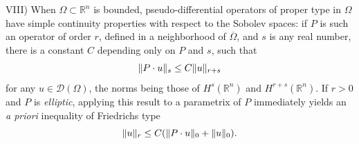 \documentclass[12pt,a4paper,leqno,twoside]{extbook}
\DeclarePairedDelimiter{\norm}{\lVert}{\rVert}
\newcommand{\R}{\mathbb{R}}
\begin{document}
VIII) When \(\Omega \subset \R^n\) is bounded, pseudo-differential operators of proper type in \(\Omega\) have simple continuity properties with respect to the Sobolev spaces: if \(P\) is such an operator of order \(r\), defined in a neighborhood of \(\overline{\Omega}\), and \(s\) is any real number, there is a constant \(C\) depending only on \(P\) and \(s\), such that
\begin{equation}
    \label{eq:9.42}
    \norm{P \cdot u}_s \leq C \norm{u}_{r+s}
\end{equation}
for any \(u \in \mathcal{D}(\Omega)\), the norms being those of \(H^s(\R^n)\) and \(H^{r+s}(\R^n)\). If \(r > 0\) and \(P\) is \emph{elliptic}, applying this result to a parametrix of \(P\) immediately yields an \emph{a priori} inequality of Friedrichs type
\begin{equation}
    \label{eq:9.43}
    \norm{u}_r \leq  C(\norm{P \cdot u}_0 + \norm{u}_0).
\end{equation}
\end{document}
